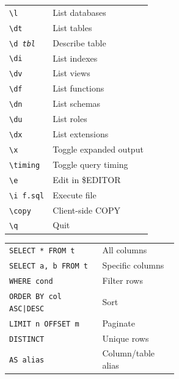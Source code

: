 \documentclass[10pt]{extarticle}
\begin{document}
\begin{multicols}{2}

\begin{tabularx}{\linewidth}{@{}l@{\enspace}Y@{}}
\texttt{\textbackslash l}            & List databases \\
\texttt{\textbackslash dt}           & List tables \\
\texttt{\textbackslash d \textit{tbl}} & Describe table \\
\texttt{\textbackslash di}           & List indexes \\
\texttt{\textbackslash dv}           & List views \\
\texttt{\textbackslash df}           & List functions \\
\texttt{\textbackslash dn}           & List schemas \\
\texttt{\textbackslash du}           & List roles \\
\texttt{\textbackslash dx}           & List extensions \\
\texttt{\textbackslash x}            & Toggle expanded output \\
\texttt{\textbackslash timing}       & Toggle query timing \\
\texttt{\textbackslash e}            & Edit in \$EDITOR \\
\texttt{\textbackslash i f.sql}      & Execute file \\
\texttt{\textbackslash copy}         & Client-side COPY \\
\texttt{\textbackslash q}            & Quit \\
\end{tabularx}

\begin{tabularx}{\linewidth}{@{}>{\raggedright\arraybackslash}p{0.55\linewidth}@{\enspace}Y@{}}
\texttt{SELECT * FROM t}            & All columns \\
\texttt{SELECT a, b FROM t}         & Specific columns \\
\texttt{WHERE cond}                  & Filter rows \\
\texttt{ORDER BY col ASC|DESC}      & Sort \\
\texttt{LIMIT n OFFSET m}           & Paginate \\
\texttt{DISTINCT}                    & Unique rows \\
\texttt{AS alias}                    & Column/table alias \\
\end{tabularx}


\end{multicols}
\end{document}
